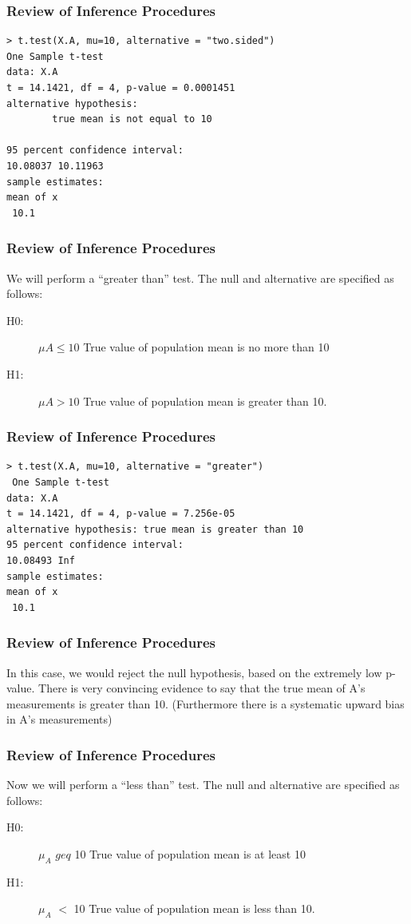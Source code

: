 \documentclass{beamer}
\begin{document}
\begin{frame}[fragile]
\frametitle{Review of Inference Procedures}
\large
\begin{framed}
\begin{verbatim}
> t.test(X.A, mu=10, alternative = "two.sided")
One Sample t-test
data: X.A
t = 14.1421, df = 4, p-value = 0.0001451
alternative hypothesis: 
		true mean is not equal to 10

95 percent confidence interval:
10.08037 10.11963
sample estimates:
mean of x
 10.1
\end{verbatim}
\end{framed}
\end{frame}
\begin{frame}[fragile]
	\frametitle{Review of Inference Procedures}
	\large
We will perform a “greater than” test. The null and alternative are
specified as follows:
\begin{description}
	\item[H0:] $μA \leq 10$ True value of population mean is no more than 10
	\item[H1:] $μA > 10$ True value of population mean is greater than 10.
\end{description}


\end{frame}
\begin{frame}[fragile]
\frametitle{Review of Inference Procedures}
\large
\begin{verbatim}
> t.test(X.A, mu=10, alternative = "greater")
 One Sample t-test
data: X.A
t = 14.1421, df = 4, p-value = 7.256e-05
alternative hypothesis: true mean is greater than 10
95 percent confidence interval:
10.08493 Inf
sample estimates:
mean of x
 10.1
\end{verbatim}
\end{frame}
\begin{frame}
\frametitle{Review of Inference Procedures}
\large
In this case, we would reject the null hypothesis, based on the
extremely low p-value. There is very convincing evidence to say
that the true mean of A’s measurements is greater than 10.
(Furthermore there is a systematic upward bias in A’s
measurements)
\end{frame}
\begin{frame}
	\frametitle{Review of Inference Procedures}
	\large
Now we will perform a “less than” test. The null and alternative are
specified as follows:
\begin{description}
	\item[H0:] $\mu_A$ $geq$ 10 True value of population mean is at least 10
	\item[H1:] $\mu_A$ $<$ 10 True value of population mean is less than 10.
\end{description}

\end{frame}
\end{document}
